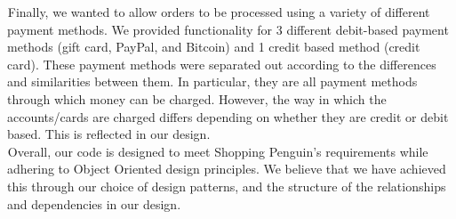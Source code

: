 \documentclass[letter paper, 12pt]{article}
\newcommand{\tab}{${}_{}$\hspace{0.2in}}
\begin{document}
\tab Finally, we wanted to allow orders to be processed using a variety of different payment methods. We provided functionality for 3 different debit-based payment methods (gift card, PayPal, and Bitcoin) and 1 credit based method (credit card). These payment methods were separated out according to the differences and similarities between them. In particular, they are all payment methods through which money can be charged. However, the way in which the accounts/cards are charged differs depending on whether they are credit or debit based. This is reflected in our design.\\
\tab Overall, our code is designed to meet Shopping Penguin's requirements while adhering to Object Oriented design principles. We believe that we have achieved this through our choice of design patterns, and the structure of the relationships and dependencies in our design.
\end{document}
